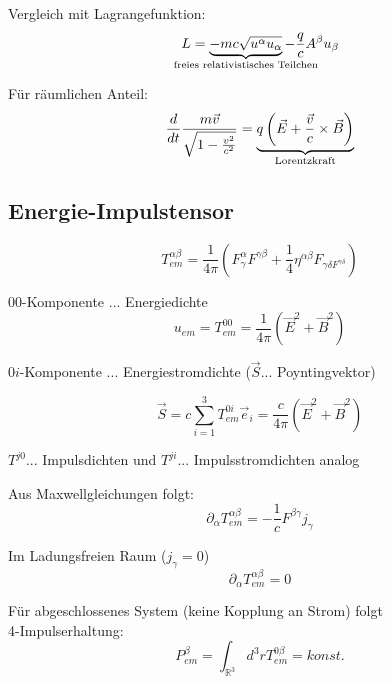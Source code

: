 \documentclass[a4paper, 11pt]{article}
\numberwithin{equation}{section}
\newcommand{\ubtext}[2]{\underbrace{#1}_{\mathclap{\text{#2}}}}
\begin{document}
Vergleich mit Lagrangefunktion:
\begin{equation*}
L = \underbrace{- mc \sqrt{u^\alpha u_\alpha}}_{\mathclap{\text{freies relativistisches Teilchen}}} - \frac{q}{c} A^\beta u_\beta
\end{equation*}

Für räumlichen Anteil:
\begin{equation}
\dfrac{d}{dt} \dfrac{m \vec{v}}{\sqrt{1 - \frac{v^2}{c^2}}} = \ubtext{q \left( \vec{E} + \frac{\vec{v}}{c} \times \vec{B} \right)}{Lorentzkraft}
\end{equation}

\subsection*{Energie-Impulstensor}

\begin{equation}
T^{\alpha \beta}_{em} = \dfrac{1}{4 \pi} \left( F^\alpha_\gamma F^{\gamma \beta} + \dfrac{1}{4} \eta^{\alpha \beta} F_{\gamma \delta F^{\gamma \delta}} \right)
\end{equation}

$00$-Komponente $...$ Energiedichte
\begin{equation}
u_{em} = T_{em}^{00} = \dfrac{1}{4 \pi} \left( \vec{E}^2 + \vec{B}^2 \right)
\end{equation}

$0i$-Komponente $...$ Energiestromdichte ($\vec{S} ...$ Poyntingvektor)

\begin{equation}
\vec{S} = c \sum_{i = 1}^3 T_{em}^{0i} \vec{e}_i = \dfrac{c}{4 \pi} \left( \vec{E}^2 + \vec{B}^2 \right)
\end{equation}

$T^{j0} ...$ Impulsdichten und $T^{ji} ...$ Impulsstromdichten analog 

Aus Maxwellgleichungen folgt:
\begin{equation}\label{glg:1_partialEnergieImpulsTensor}
\partial_\alpha T^{\alpha \beta}_{em} = - \dfrac{1}{c} F^{\beta \gamma}j_\gamma
\end{equation}


Im Ladungsfreien Raum ($j_\gamma = 0$)
\begin{equation}
\partial_\alpha T_{em}^{\alpha \beta} = 0
\end{equation}

Für abgeschlossenes System (keine Kopplung an Strom) folgt \\4-Impulserhaltung:
\begin{equation}
P^\beta_{em} = \int_{\mathbb{R}^3} d^3r T_{em}^{0\beta} = konst.
\end{equation}
\end{document}
